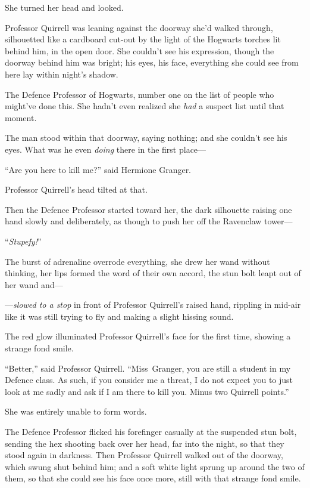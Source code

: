 She turned her head and looked.

Professor Quirrell was leaning against the doorway she’d walked through, silhouetted like a cardboard cut-out by the light of the Hogwarts torches lit behind him, in the open door. She couldn’t see his expression, though the doorway behind him was bright; his eyes, his face, everything she could see from here lay within night’s shadow.

The Defence Professor of Hogwarts, number one on the list of people who might’ve done this. She hadn’t even realized she \emph{had} a suspect list until that moment.

The man stood within that doorway, saying nothing; and she couldn’t see his eyes. What was he even \emph{doing} there in the first place—

“Are you here to kill me?” said Hermione Granger.

Professor Quirrell’s head tilted at that.

Then the Defence Professor started toward her, the dark silhouette raising one hand slowly and deliberately, as though to push her off the Ravenclaw tower—

“\emph{Stupefy!}”

The burst of adrenaline overrode everything, she drew her wand without thinking, her lips formed the word of their own accord, the stun bolt leapt out of her wand and—

—\emph{slowed to a stop} in front of Professor Quirrell’s raised hand, rippling in mid-air like it was still trying to fly and making a slight hissing sound.

The red glow illuminated Professor Quirrell’s face for the first time, showing a strange fond smile.

“Better,” said Professor Quirrell. “Miss~Granger, you are still a student in my Defence class. As such, if you consider me a threat, I do not expect you to just look at me sadly and ask if I am there to kill you. Minus two Quirrell points.”

She was entirely unable to form words.

The Defence Professor flicked his forefinger casually at the suspended stun bolt, sending the hex shooting back over her head, far into the night, so that they stood again in darkness. Then Professor Quirrell walked out of the doorway, which swung shut behind him; and a soft white light sprung up around the two of them, so that she could see his face once more, still with that strange fond smile.

